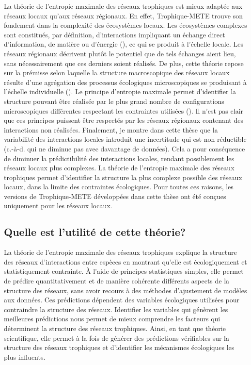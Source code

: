 La théorie de l'entropie maximale des réseaux trophiques est mieux adaptée aux
réseaux locaux qu'aux réseaux régionaux. En effet, Trophique-METE trouve son
fondement dans la complexité des écosystèmes locaux. Les écosystèmes complexes
sont constitués, par définition, d'interactions impliquant un échange direct
d'information, de matière ou d'énergie (\cite{Ladyman2013What}), ce qui se
produit à l'échelle locale. Les réseaux régionaux décrivent plutôt le potentiel
que de tels échanges aient lieu, sans nécessairement que ces derniers soient
réalisés. De plus, cette théorie repose sur la prémisse selon laquelle la
structure macroscopique des réseaux locaux résulte d'une agrégation des
processus écologiques microscopiques se produisant à l'échelle individuelle
(\cite{Frank2009Common}). Le principe d'entropie maximale permet d'identifier la
structure pouvant être réalisée par le plus grand nombre de configurations
microscopiques différentes respectant les contraintes utilisées
(\cite{Dewar2008Statistical}). Il n'est pas clair que ces principes puissent
être respectés par les réseaux régionaux contenant des interactions non
réalisées. Finalement, je montre dans cette thèse que la variabilité des
interactions locales introduit une incertitude qui est non réductible (c.-à-d.
qui ne diminue pas avec davantage de données). Cela a pour conséquence de
diminuer la prédictibilité des interactions locales, rendant possiblement les
réseaux locaux plus complexes. La théorie de l'entropie maximale des réseaux
trophiques permet d'identifier la structure la plus complexe possible des
réseaux locaux, dans la limite des contraintes écologiques. Pour toutes ces
raisons, les versions de Trophique-METE développées dans cette thèse ont été
conçues uniquement pour les réseaux locaux. 

\subsection{Quelle est l'utilité de cette théorie?} 

La théorie de l'entropie maximale des réseaux trophiques explique la structure
des réseaux d'interactions entre espèces en montrant qu'elle est écologiquement
et statistiquement contrainte. À l'aide de principes statistiques simples, elle
permet de prédire quantitativement et de manière cohérente différents aspects de
la structure des réseaux, sans avoir recours à des méthodes d'ajustement de
modèles aux données. Ces prédictions dépendent des variables écologiques
utilisées pour contraindre la structure des réseaux. Identifier les variables
qui génèrent les meilleures prédictions nous permet de mieux comprendre les
facteurs qui déterminent la structure des réseaux trophiques. Ainsi, en tant que
théorie scientifique, elle permet à la fois de générer des prédictions
vérifiables sur la structure des réseaux trophiques et d'identifier les
mécanismes écologiques les plus influents. 

